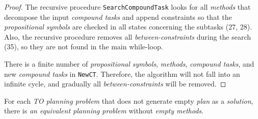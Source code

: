 \begin{proof}
    The recursive procedure \texttt{SearchCompoundTask} looks for all \emph{methods} that decompose the input \emph{compound tasks} and append constraints so that the \emph{propositional symbols} are checked in all states concerning the subtasks (27, 28). Also, the recursive procedure removes all \emph{between-constraints} during the search (35), so they are not found in the main while-loop.


    There is a finite number of \emph{propositional symbols}, \emph{methods}, \emph{compound tasks}, and new \emph{compound tasks} in \texttt{NewCT}. Therefore, the algorithm will not fall into an infinite cycle, and gradually all \emph{between-constraints} will be removed.
\end{proof}

\begin{thm}\label{thm04:10}
    For each \emph{TO planning problem} that does not generate empty \emph{plan} as a \emph{solution}, there is \emph{an equivalent planning problem} without \emph{empty methods}.
\end{thm}
